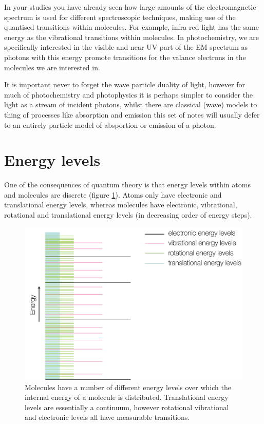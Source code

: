 \documentclass[
]{book}
\begin{document}
In your studies you have already seen how large amounts of the electromagnetic spectrum is used for different spectroscopic techniques, making use of the quantised transitions within molecules. For example, infra-red light has the same energy as the vibrational transitions within molecules. In photochemistry, we are specifically interested in the visible and near UV part of the EM spectrum as photons with this energy promote transitions for the valance electrons in the molecules we are interested in.

It is important never to forget the wave particle duality of light, however for much of photochemistry and photophysics it is perhaps simpler to consider the light as a stream of incident photons, whilst there are classical (wave) models to thing of processes like absorption and emission this set of notes will usually defer to an entirely particle model of absportion or emission of a photon.

\hypertarget{subsec:energylevels}{%
\section{Energy levels}\label{subsec:energylevels}}

One of the consequences of quantum theory is that energy levels within atoms and molecules are discrete (figure \ref{fig:energylevels}). Atoms only have electronic and translational energy levels, whereas molecules have electronic, vibrational, rotational and translational energy levels (in decreasing order of energy steps).

\begin{figure}

{\centering \includegraphics[width=0.6\linewidth]{images/energylevels} 

}

\caption{Molecules have a number of different energy levels over which the internal energy of a molecule is distributed. Translational energy levels are essentially a continuum, however rotational vibrational and electronic levels all have measurable transitions.}\label{fig:energylevels}
\end{figure}
\end{document}
